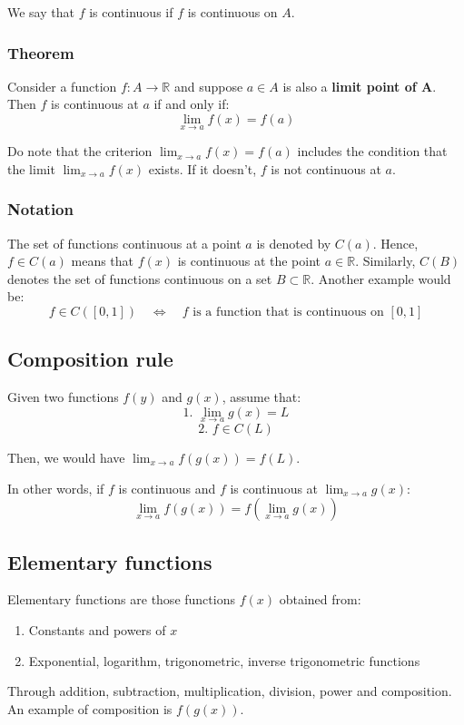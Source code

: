 \documentclass[11pt]{article}
\begin{document}
We say that \(f\) is continuous if \(f\) is continuous on \(A\).
\subsubsection{Theorem}
\label{sec:orgfbc3042}
Consider a function \(f : A \rightarrow \mathbb{R}\) and suppose \(a \in A\) is also a \textbf{limit point of A}. Then \(f\) is continuous at \(a\) if and only if:
\[\lim_{x \rightarrow a} f(x) = f(a)\]

Do note that the criterion \(\lim_{x \rightarrow a} f(x) = f(a)\) includes the condition that the limit \(\lim_{x \rightarrow a} f(x)\) exists. If it doesn't, \(f\) is not continuous at \(a\).
\subsubsection{Notation}
\label{sec:org97c80bc}
The set of functions continuous at a point \(a\) is denoted by \(C(a)\). Hence, \(f \in C(a)\) means that \(f(x)\) is continuous at the point \(a \in \mathbb{R}\). Similarly, \(C(B)\) denotes the set of functions continuous on a set \(B \subset \mathbb{R}\). Another example would be:
\[f \in C([0, 1]) \quad \Leftrightarrow \quad f \text{ is a function that is continuous on } [0, 1]\]
\subsection{Composition rule}
\label{sec:org337183c}
Given two functions \(f(y)\) and \(g(x)\), assume that:
\[\text{1. } \lim_{x \rightarrow a} g(x) = L\]
\[\text{2. } f \in C(L)\]

Then, we would have \(\lim_{x \rightarrow a} f(g(x)) = f(L)\).


In other words, if \(f\) is continuous and \(f\) is continuous at \(\lim_{x \rightarrow a} g(x)\):
\[\lim_{x \rightarrow a} f(g(x)) = f(\lim_{x \rightarrow a} g(x))\]
\subsection{Elementary functions}
\label{sec:orgd05c0c2}
Elementary functions are those functions \(f(x)\) obtained from:
\begin{enumerate}
\item Constants and powers of \(x\)
\item Exponential, logarithm, trigonometric, inverse trigonometric functions
\end{enumerate}

Through addition, subtraction, multiplication, division, power and composition. An example of composition is \(f(g(x))\).
\end{document}
